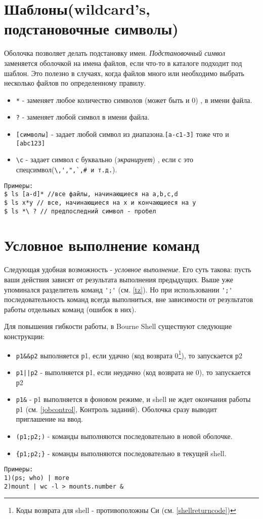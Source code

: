 \section{Шаблоны(wildcard's, подстановочные символы)}

Оболочка позволяет делать подстановку имен. \emph{Подстановочный символ} заменяется оболочкой на имена файлов, если что-то в каталоге подходит под шаблон. Это полезно в случаях, когда файлов много или необходимо выбрать несколько файлов по определенному правилу.
\begin{itemize}
\item \verb+*+  - заменяет любое количество символов (может быть и 0) , в имени файла.
\item \verb+?+  - заменяет любой символ в имени файла.
\item \verb+[символы]+ -  задает любой символ из диапазона.\verb+[a-c1-3]+ тоже что и  \verb+[abc123]+
\item \verb+\с+  - задает символ с буквально (\emph{экранирует}) \label{slash}, если с  это спецсимвол(\verb+\,',",`,# и т.д.+).
\end{itemize}
\begin{verbatim}
Примеры: 
$ ls [a-d]* //все файлы, начинающиеся на a,b,c,d
$ ls x*y // все, начинающиеся на x и кончающиеся на y
$ ls *\ ? // предпоследний символ - пробел
\end{verbatim}

\section{Условное выполнение команд}

Следующая удобная возможность - \emph{условное выполнение}. Его суть такова: пусть ваши действия зависят от результата выполнения предыдущих. Выше уже упоминался разделитель команд \verb+';'+ (см. \ref{tz}). Но при использовании \verb+';'+ последовательность команд всегда выполниться, вне зависимости от результатов работы отдельных команд (ошибок в них). 

Для повышения гибкости работы, в Bourne Shell существуют следующие конструкции: 
\begin{itemize}
\item \verb+p1&&p2+  выполняется р1, если удачно (код возврата 0\footnote{Коды возврата для shell - противоположны Си (см. \ref{shellreturncode})}), то запускается р2
\item \verb+p1||p2+ - выполняется р1, если неудачно (код возврата не 0), то запускается р2
\item \verb+p1&+ - р1 выполняется в фоновом режиме, и shell не ждет окончания работы р1 (см. \ref{jobcontrol}, Контроль заданий). Оболочка сразу выводит приглашение на ввод.
\item \verb+(p1;p2;)+ - команды выполняются последовательно в новой оболочке.  
\item \verb+{p1;p2;}+ - команды выполняются последовательно в текущей shell.
\end{itemize}
\begin{verbatim}
Примеры: 
1)(ps; who) | more
2)mount | wc -l > mounts.number &
\end{verbatim}

